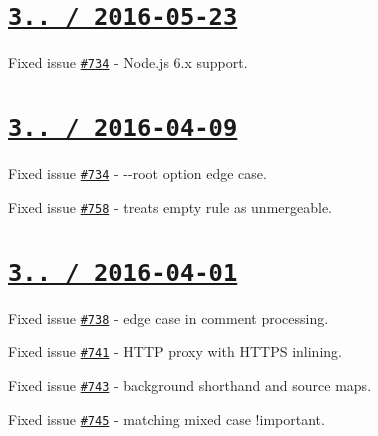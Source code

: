 \section*{\href{https://github.com/jakubpawlowicz/clean-css/compare/v3.4.12...v3.4.13}{\tt 3.. / 2016-\/05-\/23} }


\begin{DoxyItemize}
\item Fixed issue \href{https://github.com/jakubpawlowicz/clean-css/issues/769}{\tt \#734} -\/ Node.\+js 6.\+x support.
\end{DoxyItemize}

\section*{\href{https://github.com/jakubpawlowicz/clean-css/compare/v3.4.11...v3.4.12}{\tt 3.. / 2016-\/04-\/09} }


\begin{DoxyItemize}
\item Fixed issue \href{https://github.com/jakubpawlowicz/clean-css/issues/734}{\tt \#734} -\/ {\ttfamily -\/-\/root} option edge case.
\item Fixed issue \href{https://github.com/jakubpawlowicz/clean-css/issues/758}{\tt \#758} -\/ treats empty rule as unmergeable.
\end{DoxyItemize}

\section*{\href{https://github.com/jakubpawlowicz/clean-css/compare/v3.4.10...v3.4.11}{\tt 3.. / 2016-\/04-\/01} }


\begin{DoxyItemize}
\item Fixed issue \href{https://github.com/jakubpawlowicz/clean-css/issues/738}{\tt \#738} -\/ edge case in comment processing.
\item Fixed issue \href{https://github.com/jakubpawlowicz/clean-css/issues/741}{\tt \#741} -\/ H\+T\+TP proxy with H\+T\+T\+PS inlining.
\item Fixed issue \href{https://github.com/jakubpawlowicz/clean-css/issues/743}{\tt \#743} -\/ background shorthand and source maps.
\item Fixed issue \href{https://github.com/jakubpawlowicz/clean-css/issues/745}{\tt \#745} -\/ matching mixed case {\ttfamily !important}.
\end{DoxyItemize}

